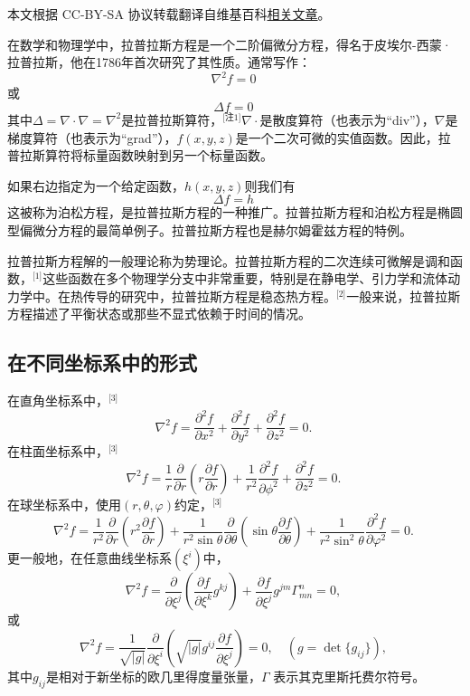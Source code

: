 
本文根据 CC-BY-SA 协议转载翻译自维基百科\href{https://en.wikipedia.org/wiki/Laplace\%27s_equation}{相关文章}。

在数学和物理学中，拉普拉斯方程是一个二阶偏微分方程，得名于皮埃尔-西蒙·拉普拉斯，他在1786年首次研究了其性质。通常写作：
\[
\nabla^2 f = 0~
\]
或
\[
\Delta f = 0~
\]
其中\(\Delta = \nabla \cdot \nabla = \nabla^2\)是拉普拉斯算符，\(^\text{[注1]}\)\(\nabla\cdot\)是散度算符（也表示为“div”），\(\nabla\)是梯度算符（也表示为“grad”），\(f(x, y, z)\)是一个二次可微的实值函数。因此，拉普拉斯算符将标量函数映射到另一个标量函数。

如果右边指定为一个给定函数，\(h(x, y, z)\)则我们有
\[
\Delta f = h~
\]
这被称为泊松方程，是拉普拉斯方程的一种推广。拉普拉斯方程和泊松方程是椭圆型偏微分方程的最简单例子。拉普拉斯方程也是赫尔姆霍兹方程的特例。

拉普拉斯方程解的一般理论称为势理论。拉普拉斯方程的二次连续可微解是调和函数，\(^\text{[1]}\)这些函数在多个物理学分支中非常重要，特别是在静电学、引力学和流体动力学中。在热传导的研究中，拉普拉斯方程是稳态热方程。\(^\text{[2]}\)一般来说，拉普拉斯方程描述了平衡状态或那些不显式依赖于时间的情况。
\subsection{在不同坐标系中的形式} 
在直角坐标系中，\(^\text{[3]}\)
\[
\nabla^2 f = \frac{\partial^2 f}{\partial x^2} + \frac{\partial^2 f}{\partial y^2} + \frac{\partial^2 f}{\partial z^2} = 0.~
\]
在柱面坐标系中，\(^\text{[3]}\)
\[
\nabla^2 f = \frac{1}{r} \frac{\partial}{\partial r} \left( r \frac{\partial f}{\partial r} \right) + \frac{1}{r^2} \frac{\partial^2 f}{\partial \phi^2} + \frac{\partial^2 f}{\partial z^2} = 0.~
\]
在球坐标系中，使用\( (r, \theta, \varphi) \)约定，\(^\text{[3]}\)
\[
\nabla^2 f = \frac{1}{r^2} \frac{\partial}{\partial r} \left( r^2 \frac{\partial f}{\partial r} \right) + \frac{1}{r^2 \sin \theta} \frac{\partial}{\partial \theta} \left( \sin \theta \frac{\partial f}{\partial \theta} \right) + \frac{1}{r^2 \sin^2 \theta} \frac{\partial^2 f}{\partial \varphi^2} = 0.~
\]
更一般地，在任意曲线坐标系\( (\xi^i) \)中，
\[
\nabla^2 f = \frac{\partial}{\partial \xi^j} \left( \frac{\partial f}{\partial \xi^k} g^{kj}\right) + \frac{\partial f}{\partial \xi^j} g^{jm}\Gamma_{mn}^n = 0,~
\]
或
\[
\nabla^2 f = \frac{1}{\sqrt{|g|}} \frac{\partial}{\partial \xi^i} \left( \sqrt{|g|} g^{ij} \frac{\partial f}{\partial \xi^j} \right) = 0, \quad (g = \det \{g_{ij}\}),~
\]
其中\( g_{ij} \)是相对于新坐标的欧几里得度量张量，\( \Gamma \) 表示其克里斯托费尔符号。
